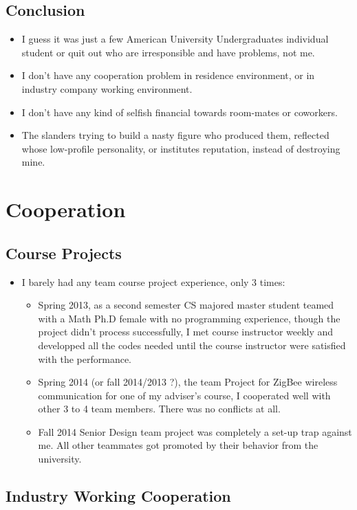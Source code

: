 \documentclass[9pt,b5paper]{article}
\begin{document}
\subsection{Conclusion}
\label{sec-3-3}
\begin{itemize}
\item I guess it was just a few American University Undergraduates individual student or quit out who are irresponsible and have problems, not me.
\item I don't have any cooperation problem in residence environment, or in industry company working environment.
\item I don't have any kind of selfish financial towards room-mates or coworkers.
\item The slanders trying to build a nasty figure who produced them, reflected whose low-profile personality, or institutes reputation, instead of destroying mine.
\end{itemize}

\section{Cooperation}
\label{sec-4}
\subsection{Course Projects}
\label{sec-4-1}
\begin{itemize}
\item I barely had any team course project experience, only 3 times:
\begin{itemize}
\item Spring 2013, as a second semester CS majored master student teamed with a Math Ph.D female with no programming experience, though the project didn't process successfully, I met course instructor weekly and developped all the codes needed until the course instructor were satisfied with the performance.
\item Spring 2014 (or fall 2014/2013 ?), the team Project for ZigBee wireless communication for one of my adviser's course, I cooperated well with other 3 to 4 team members. There was no conflicts at all.
\item Fall 2014 Senior Design team project was completely a set-up trap against me. All other teammates got promoted by their behavior from the university.
\end{itemize}
\end{itemize}
\subsection{Industry Working Cooperation}
\label{sec-4-2}
\end{document}
